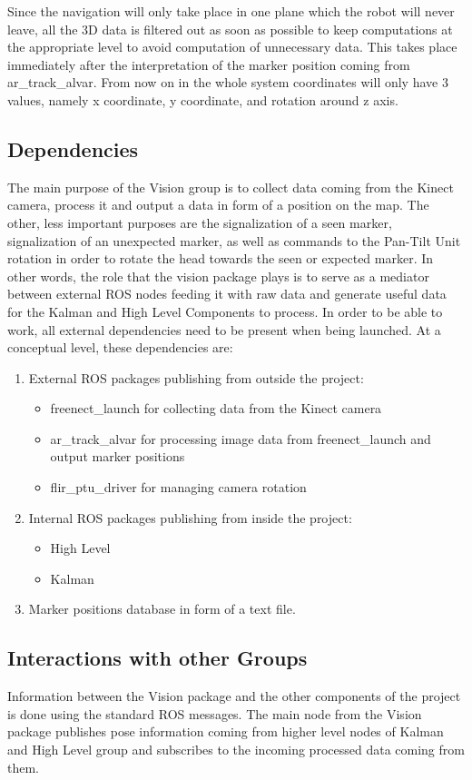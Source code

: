 Since the navigation will only take place in one plane which the robot will never leave, all the 3D data is filtered out as soon as possible to keep computations at the appropriate level to avoid computation of unnecessary data. This takes place immediately after the interpretation of the marker position coming from ar\_track\_alvar. From now on in the whole system coordinates will only have 3 values, namely x coordinate, y coordinate, and rotation around z axis. 

\subsection{Dependencies}
The main purpose of the Vision group is to collect data coming from the Kinect camera, process it and output a data in form of a position on the map. The other, less important purposes are the signalization of a seen marker, signalization of an unexpected marker, as well as commands to the Pan-Tilt Unit rotation in order to rotate the head towards the seen or expected marker. In other words, the role that the vision package plays is to serve as a mediator between external ROS nodes feeding it with raw data and generate useful data for the Kalman and High Level Components to process. In order to be able to work, all external dependencies need to be present when being launched. At a conceptual level, these dependencies are:

\begin{enumerate}
\item External ROS packages publishing from outside the project:
\begin{itemize}
\item freenect\_launch for collecting data from the Kinect camera
\item ar\_track\_alvar for processing image data from freenect\_launch and output marker positions
\item flir\_ptu\_driver for managing camera rotation
\end{itemize}
\item Internal ROS packages publishing from inside the project: 
\begin{itemize}
\item High Level
\item Kalman
\end{itemize}
\item Marker positions database in form of a text file.
\end{enumerate}

\subsection{Interactions with other Groups}
Information between the Vision package and the other components of the project is done using the standard ROS messages. The main node from the Vision package publishes pose information coming from higher level nodes of Kalman and High Level group and subscribes to the incoming processed data coming from them.

